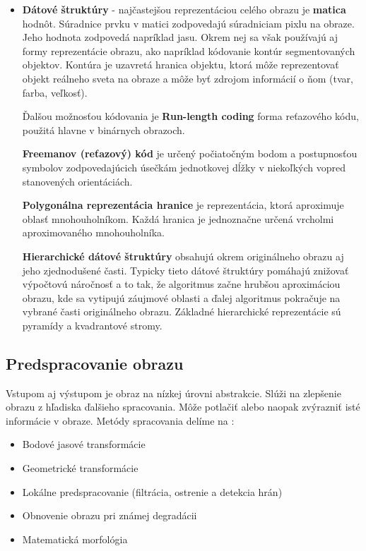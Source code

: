 \begin{itemize}
\item \textbf{Dátové štruktúry} - najčastejšou reprezentáciou celého obrazu je \textbf{matica} hodnôt. Súradnice prvku v matici zodpovedajú súradniciam pixlu na obraze. Jeho hodnota zodpovedá napríklad jasu.  Okrem nej sa však používajú aj formy reprezentácie obrazu, ako napríklad kódovanie kontúr segmentovaných objektov. Kontúra je uzavretá hranica objektu, ktorá môže reprezentovať objekt reálneho sveta na obraze a môže byť zdrojom informácií o ňom (tvar, farba, veľkosť). \cite{Analysis_and_Machine_Vision}

Ďalšou možnosťou kódovania je \textbf{Run-length coding} forma reťazového kódu, použitá hlavne v binárnych obrazoch. 

\textbf{Freemanov (reťazový) kód} je určený počiatočným bodom a postupnosťou symbolov zodpovedajúcich úsečkám jednotkovej dĺžky v niekoľkých vopred stanovených orientáciách. \cite{Analysis_and_Machine_Vision} 

\textbf{Polygonálna reprezentácia hranice} je reprezentácia, ktorá aproximuje oblasť mnohouholníkom. Každá hranica je jednoznačne určená vrcholmi aproximovaného mnohouholníka. \cite{Analysis_and_Machine_Vision}

\textbf{Hierarchické dátové štruktúry} obsahujú okrem originálneho obrazu aj jeho zjednodušené časti. Typicky tieto dátové štruktúry pomáhajú znižovať výpočtovú náročnosť a to tak, že algoritmus začne hrubšou aproximáciou obrazu, kde sa vytipujú záujmové oblasti a ďalej algoritmus pokračuje na vybrané časti originálneho obrazu. Základné hierarchické reprezentácie sú pyramídy a kvadrantové stromy. \cite{Analysis_and_Machine_Vision} 

\end{itemize}



\subsection{Predspracovanie obrazu}
Vstupom aj výstupom je obraz na nízkej úrovni abstrakcie. Slúži na zlepšenie obrazu z hľadiska ďalšieho spracovania. Môže potlačiť alebo naopak zvýrazniť isté informácie v obraze. Metódy spracovania delíme na \cite{pocitacove_videnie_v_praxi}:
\begin{itemize}
\item Bodové jasové transformácie
\item Geometrické transformácie
\item Lokálne predspracovanie (filtrácia, ostrenie a detekcia hrán)
\item Obnovenie obrazu pri známej degradácii 
\item Matematická morfológia 
\end{itemize}

